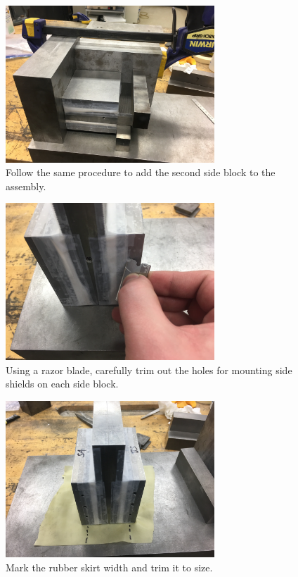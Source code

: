 \begin{figure}
	\centering
        \includegraphics[width=0.7\textwidth]{appendix_sample_prep/dds_two_block_jig.jpg}
   	\caption{Follow the same procedure to add the second side block to the assembly.}
  	\label{Fig:dds_two_block_jig}
\end{figure}

\clearpage

\begin{figure}
	\centering
        \includegraphics[width=0.7\textwidth]{appendix_sample_prep/dds_trim_holes.jpg}
   	\caption{Using a razor blade, carefully trim out the holes for mounting side shields on each side block.}
  	\label{Fig:dds_trim_holes}
\end{figure}

\begin{figure}
	\centering
        \includegraphics[width=0.7\textwidth]{appendix_sample_prep/dds_mark_rubber.jpg}
   	\caption{Mark the rubber skirt width and trim it to size.}
  	\label{Fig:dds_mark_rubber}
\end{figure}

